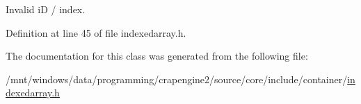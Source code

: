 Invalid i\+D / index. 



Definition at line 45 of file indexedarray.\+h.



The documentation for this class was generated from the following file\+:\begin{DoxyCompactItemize}
\item 
/mnt/windows/data/programming/crapengine2/source/core/include/container/\hyperlink{indexedarray_8h}{indexedarray.\+h}\end{DoxyCompactItemize}
